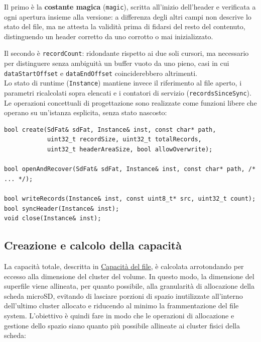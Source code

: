 Il primo è la \textbf{costante magica} (\texttt{magic}), scritta all'inizio 
dell'header e verificata a ogni apertura insieme alla versione: a differenza 
degli altri campi non descrive lo stato del file, ma ne attesta la validità 
prima di fidarsi del resto del contenuto, distinguendo un header corretto da 
uno corrotto o mai inizializzato. 

Il secondo è \texttt{recordCount}: ridondante rispetto ai due soli cursori, ma
necessario per distinguere senza ambiguità un buffer vuoto da uno pieno, casi
in cui \texttt{dataStartOffset} e \texttt{dataEndOffset} coinciderebbero
altrimenti. \\

Lo stato di runtime (\texttt{Instance}) mantiene invece il riferimento al file
aperto, i parametri ricalcolati sopra elencati e i contatori di servizio
(\texttt{recordsSinceSync}). Le operazioni concettuali di progettazione sono
realizzate come funzioni libere che operano su un'istanza esplicita, senza
stato nascosto:

\begin{listing}[H]
\begin{verbatim}
bool create(SdFat& sdFat, Instance& inst, const char* path,
            uint32_t recordSize, uint32_t totalRecords,
            uint32_t headerAreaSize, bool allowOverwrite);

bool openAndRecover(SdFat& sdFat, Instance& inst, const char* path, /* ... */);

bool writeRecords(Instance& inst, const uint8_t* src, uint32_t count);
bool syncHeader(Instance& inst);
void close(Instance& inst);
\end{verbatim}
\caption{Interfaccia del modulo superfile (\texttt{openAndRecover} condivide gli stessi parametri di \texttt{create}, omessi per brevità)}
\label{listing:superfile-interface}
\end{listing}

\subsection{Creazione e calcolo della capacità}
La capacità totale, descritta in
\hyperref[subsec:capacita_superfile]{Capacità del file}, è calcolata
arrotondando per eccesso alla dimensione del \gls{cluster} del volume. In questo
modo, la dimensione del superfile viene allineata, per quanto possibile, alla
granularità di allocazione della scheda microSD, evitando di lasciare
porzioni di spazio inutilizzate all’interno dell’ultimo cluster allocato e
riducendo al minimo la frammentazione del file system. L’obiettivo è quindi
fare in modo che le operazioni di allocazione e gestione dello spazio siano
quanto più possibile allineate ai cluster fisici della scheda:

